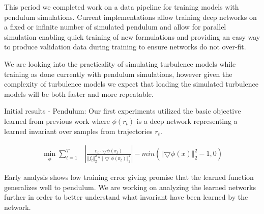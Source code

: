 \documentclass[10pt,letterpaper]{report}
\author{Brandon Houghton}
\begin{document}
This period we completed work on a data pipeline for training models with pendulum simulations. Current implementations allow training deep networks on a fixed or infinite number of simulated pendulum and allow for parallel simulation enabling quick training of new formulations and providing an easy way to produce validation data during training to ensure networks do not over-fit.

We are looking into the practicality of simulating turbulence models while training as done currently with pendulum simulations, however given the complexity of turbulence models we expect that loading the simulated turbulence models will be both faster and more repeatable. 

Initial results - Pendulum: Our first experiments utilized the basic objective learned from previous work  where $ \phi(r_t) $ is a deep network representing a learned invariant over samples from trajectories $r_t$. 

\begin{align}
\min_{\phi} \sum^{T}_{t = 1} &  
\left\vert
\frac{\dot{\pmb{r}_t} \cdot \bigtriangledown \phi \left( \pmb{r}_t \right)}{{\Vert f_t \Vert}^2_2 * {\Vert \bigtriangledown \phi (\pmb{r}_t) \Vert}^2_2}
\right\vert
-
min(\left\Vert \bigtriangledown \phi ( x ) \right\Vert^2_2 - 1 , 0)
\end{align}

Early analysis shows low training error giving promise that the learned function generalizes well to pendulum. We are working on analyzing the learned networks further in order to better understand what invariant have been learned by the network.
\end{document}
